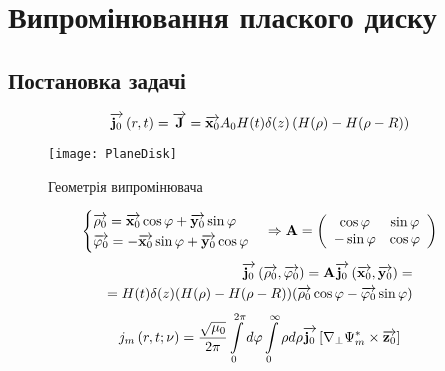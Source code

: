 \chapter{Випромінювання плаского диску}
\label{ch:pdisk}

\section{Постановка задачі}
%
\begin{equation}
\overrightarrow{\mathbf j_0} \left( r, t \right) = \overrightarrow{\mathbf J} = \overrightarrow{\mathbf x_0} A_0 H(t) \delta(z) 
\left(  H(\rho) - H(\rho - R) \right)
\end{equation}
%
\begin{figure}[htbp] \begin{center}
\texttt{[image: PlaneDisk]}
\caption{Геометрія випромінювача} \label{fig:pdisk}
\end{center} \end{figure}
%
%
\textcolor{lightgray} { \begin{equation*} \begin{aligned}
\begin{cases}
\overrightarrow{\mathbf \rho_0} = \overrightarrow{\mathbf x_0} \cos \varphi + \overrightarrow{\mathbf y_0} \sin \varphi \\
\overrightarrow{\mathbf \varphi_0} = - \overrightarrow{\mathbf x_0} \sin \varphi + \overrightarrow{\mathbf y_0} \cos \varphi
\end{cases} \Rightarrow \mathbf{A} = \left( \begin{array}{cc}
\cos \varphi & \sin \varphi \\
- \sin \varphi & \cos \varphi
\end{array} \right)
\end{aligned} \end{equation*} }
%
\textcolor{lightgray} { \begin{equation*} \begin{aligned}
\overrightarrow{\mathbf j_0} \left( \overrightarrow{\mathbf \rho_0}, \overrightarrow{\mathbf \varphi_0} \right) = 
\mathbf{A} \overrightarrow{\mathbf j_0} \left( \overrightarrow{\mathbf x_0}, \overrightarrow{\mathbf y_0} \right) = \\
= H(t) \delta(z) (  H(\rho) - H(\rho - R) ) 
( \overrightarrow{\mathbf \rho_0} \cos \varphi - \overrightarrow{\mathbf \varphi_0} \sin \varphi )
\end{aligned} \end{equation*} }
%
\begin{equation}
j_m \left( r, t; \nu \right) = \frac{\sqrt{\mu_0}}{2\pi} 
\int \limits_{0}^{2\pi} d \varphi \int \limits_{0}^{\infty} \rho d \rho 
\overrightarrow{\mathbf j_0} \left[  \nabla_\perp \Psi_m^*  \times  \overrightarrow{\mathbf z_0}  \right]
\end{equation}
